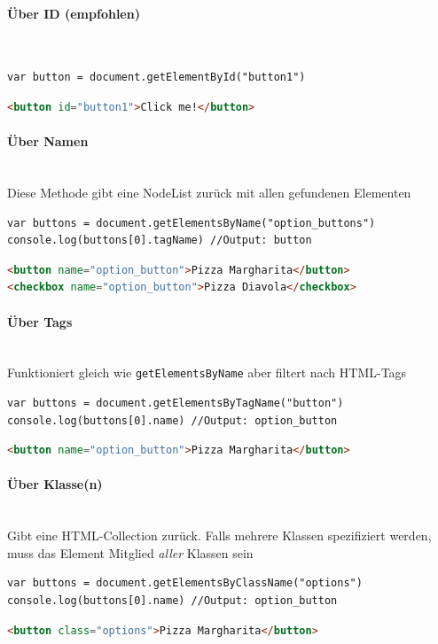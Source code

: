 \documentclass[a4paper, 11pt]{article}
\newcommand{\code}[1]{\texttt{#1}}
\begin{document}
\paragraph{Über ID (empfohlen)}\mbox{}\\
\begin{lstlisting}
var button = document.getElementById("button1")
\end{lstlisting}

\begin{lstlisting}[language=html]
<button id="button1">Click me!</button>
\end{lstlisting}

\paragraph{Über Namen}\mbox{}\\
Diese Methode gibt eine NodeList zurück mit allen gefundenen Elementen
\begin{lstlisting}
var buttons = document.getElementsByName("option_buttons")
console.log(buttons[0].tagName) //Output: button
\end{lstlisting}
\begin{lstlisting}[language=html]
<button name="option_button">Pizza Margharita</button>
<checkbox name="option_button">Pizza Diavola</checkbox>
\end{lstlisting}

\paragraph{Über Tags}\mbox{}\\
Funktioniert gleich wie \code{getElementsByName} aber filtert nach HTML-Tags
\begin{lstlisting}
var buttons = document.getElementsByTagName("button")
console.log(buttons[0].name) //Output: option_button
\end{lstlisting}
\begin{lstlisting}[language=html]
<button name="option_button">Pizza Margharita</button>
\end{lstlisting}

\paragraph{Über Klasse(n)}\mbox{}\\
Gibt eine HTML-Collection zurück. Falls mehrere Klassen spezifiziert werden, muss das Element Mitglied \textit{aller} Klassen sein
\begin{lstlisting}
var buttons = document.getElementsByClassName("options")
console.log(buttons[0].name) //Output: option_button
\end{lstlisting}
\begin{lstlisting}[language=html]
<button class="options">Pizza Margharita</button>
\end{lstlisting}
\end{document}
